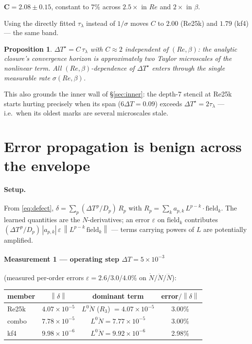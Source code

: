 \documentclass[11pt]{article}
\newtheorem{proposition}{Proposition}
\theoremstyle{remark}
\newcommand{\DT}{\Delta T}
\newcommand{\DTs}{\Delta T^{\star}}
\newcommand{\taul}{\tau_{\lambda}}
\newcommand{\norm}[1]{\left\lVert #1 \right\rVert}
\begin{document}
\begin{center}
$\mathbf{C = 2.08 \pm 0.15}$, constant to 7\% across $2.5\times$ in $Re$ and
$2\times$ in $\beta$.
\end{center}

Using the directly fitted $\taul$ instead of $1/\sigma$ moves $C$ to $2.00$
(Re25k) and $1.79$ (kf4) --- the same band.

\begin{proposition}\label{prop:two-micro}
$\DTs = C\,\taul$ with $C \approx 2$ independent of $(Re,\beta)$: the
analytic closure's convergence horizon is approximately \emph{two Taylor
microscales of the nonlinear term}. All $(Re,\beta)$-dependence of $\DTs$
enters through the single measurable rate $\sigma(Re,\beta)$.
\end{proposition}

This also grounds the inner wall of \S\ref{sec:inner}: the depth-7 stencil
at Re25k starts hurting precisely when its span ($6\DT = 0.09$) exceeds
$\DTs = 2\taul$ --- i.e.\ when its oldest marks are several microscales
stale.

\section{Error propagation is benign across the envelope}\label{sec:amplification}

\paragraph{Setup.}
From \eqref{eq:defect}, $\delta = \sum_p (\DT^{\,p}/D_p)\,R_p$ with
$R_p = \sum_k a_{p,k}\,L^{p-k}\cdot\mathrm{field}_k$. The learned quantities
are the $N$-derivatives; an error $\varepsilon$ on $\mathrm{field}_k$
contributes $(\DT^{\,p}/D_p)\,|a_{p,k}|\,\varepsilon\,
\norm{L^{p-k}\,\mathrm{field}_k}$ --- terms carrying powers of $L$ are
potentially amplified.

\paragraph{Measurement 1 --- operating step $\DT = 5\times10^{-3}$}
(measured per-order errors $\varepsilon = 2.6/3.0/4.0\%$ on
$\dot N/\ddot N/\dddot N$):

\begin{center}
\begin{tabular}{lccc}
\toprule
member & $\norm{\delta}$ & dominant term & error$/\norm{\delta}$\\
\midrule
Re25k & $4.07\times10^{-5}$ & $L^0\ddot N$ ($R_3$) $= 4.07\times10^{-5}$ & 3.00\%\\
combo & $7.78\times10^{-5}$ & $L^0\ddot N = 7.77\times10^{-5}$ & 3.00\%\\
kf4   & $9.98\times10^{-6}$ & $L^0\ddot N = 9.92\times10^{-6}$ & 2.98\%\\
\bottomrule
\end{tabular}
\end{center}
\end{document}
